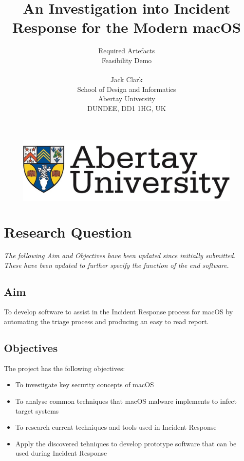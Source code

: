 \documentclass[11pt,a4paper]{article}
\title{An Investigation into Incident Response for the Modern macOS}
\author{Required Artefacts\\Feasibility Demo\\ \\Jack Clark\\School of Design and Informatics\\Abertay University\\DUNDEE, DD1 1HG, UK}
\begin{document}

\begin{figure}
		\includegraphics[width=\linewidth]{Abertay}
\end{figure} 


\maketitle

\newpage

\tableofcontents

\newpage


\section{Research Question}

\textit{The following Aim and Objectives have been updated since initially submitted. These have been updated to further specify the function of the end software.}

\subsection{Aim}

To develop software to assist in the Incident Response process for macOS by automating the triage process and producing an easy to read report.

\subsection{Objectives}

The project has the following objectives:

\begin{itemize}
	\item{To investigate key security concepts of macOS}
	\item{To analyse common techniques that macOS malware implements to infect target systems}
	\item{To research current techniques and tools used in Incident Response}
	\item{Apply the discovered tehniques to develop prototype software that can be used during Incident Response}
\end{itemize}
\end{document}
